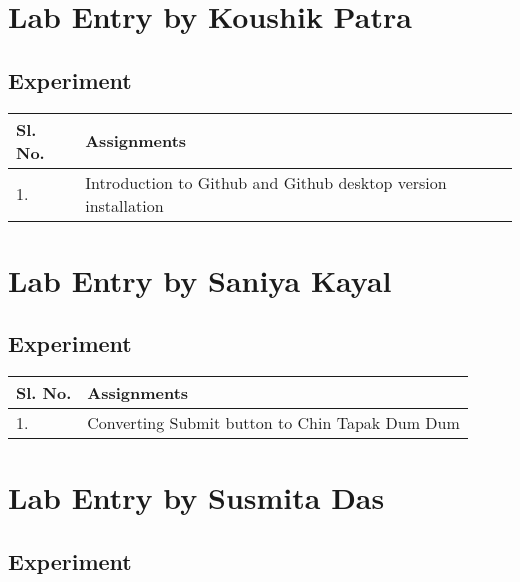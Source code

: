 \documentclass[a4paper,12pt]{article}
\begin{document}
\vspace{1.5cm}
\section{Lab Entry by Koushik Patra}

\vspace{0.7cm}
\subsection{Experiment}

\vspace{0.5cm}

\begin{table}[ht]
\centering
\begin{tabular}{|p{50pt}|p{200pt}|}
\hline
\textbf{Sl. No.} & \textbf{Assignments} \\ \hline
1. & Introduction to Github and Github desktop version installation \\ \hline
\end{tabular}
\end{table}

\section{Lab Entry by Saniya Kayal}
\subsection{Experiment}

\vspace{0.5cm}
\begin{table}[ht]
\centering
\begin{tabular}{|p{50pt}|p{200pt}|}
\hline
\textbf{Sl. No.} & \textbf{Assignments} \\ \hline
1. & Converting Submit button to Chin Tapak Dum Dum \\ \hline
\end{tabular}
\end{table}

\section{Lab Entry by Susmita Das}
\subsection{Experiment}
\end{document}

